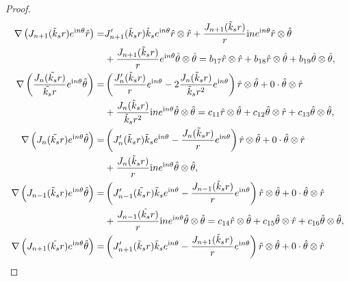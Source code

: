 \documentclass[11pt,reqno,twoside]{amsart}
\theoremstyle{definition}
\theoremstyle{remark}
\numberwithin{equation}{section}
\begin{document}
\begin{proof}
\begin{align}
		\nabla \left ( J_{n+1} (\tilde{k}_{s}  r)  e^{\mathrm{i}n\theta } \hat{r}\right )=& J_{n+1}' (\tilde{k}_{s} r) \tilde{k}_{s} e^{\mathrm{i}n\theta } \hat{r}\otimes\hat{r}+\frac{J_{n+1} ( \tilde{k}_{s}  r )}{r}\mathrm{i}n e^{\mathrm{i}n\theta }\hat{r}\otimes\hat{\theta }\notag\\
		&+\frac{J_{n+1} ( \tilde{k}_{s}  r )}{r}e^{\mathrm{i}n\theta }\hat{\theta }\otimes\hat{\theta }=b_{17}\hat{r}\otimes\hat{r}+b_{18}\hat{r}\otimes\hat{\theta }+b_{19}\hat{\theta }\otimes\hat{\theta },\notag\\
		\nabla \left ( \frac{J_{n} (\tilde{k_{s} } r )}{\tilde{k_{s}}r} e^{\mathrm{i}n\theta } \hat{\theta}  \right )=&\left( \frac{J_{n}' (\tilde{k}_{s}  r  )}{r} e^{\mathrm{i}n\theta } -2\frac{J_{n} (\tilde{k}_{s}  r  )}{\tilde{k}_{s}r^2} e^{\mathrm{i}n\theta }\right)\hat{r}\otimes\hat{\theta }+0\cdot \hat{\theta}\otimes\hat{r }\notag\\
		&+\frac{J_{n} (\tilde{k}_{s}  r )}{\tilde{k}_{s}r^2}\mathrm{i}ne^{\mathrm{i}n\theta }\hat{\theta }\otimes\hat{\theta }=c_{11}\hat{r}\otimes\hat{\theta }+c_{12}\hat{\theta}\otimes\hat{r }+c_{13}\hat{\theta }\otimes\hat{\theta },\notag\\
		\nabla \left ( J_{n} (\tilde{k_{s} } r ) e^{\mathrm{i}n\theta }\hat{\theta} \right )=&\left( J_{n}' (\tilde{k}_{s}  r ) \tilde{k}_{s} e^{\mathrm{i}n\theta } -\frac{J_{n} ( \tilde{k}_{s}  r )}{r} e^{\mathrm{i}n\theta }\right)\hat{r}\otimes\hat{\theta }+0\cdot \hat{\theta }\otimes\hat{r}\notag\\
		&+\frac{J_{n} ( \tilde{k}_{s}  r )}{r}\mathrm{i}ne^{\mathrm{i}n\theta }\hat{\theta }\otimes\hat{\theta },\notag\\
		\nabla \left ( J_{n-1} (\tilde{k}_{s}  r ) e^{\mathrm{i}n\theta } \hat{\theta} \right )=&\left( J_{n-1}' (\tilde{k_{s} }r) \tilde{k}_{s} e^{\mathrm{i}n\theta } -\frac{J_{n-1} ( \tilde{k}_{s}  r )}{r} e^{\mathrm{i}n\theta }\right)\hat{r}\otimes\hat{\theta }+0\cdot \hat{\theta }\otimes\hat{r}\notag\\
		&+\frac{J_{n-1} ( \tilde{k_{s} } r )}{r}\mathrm{i}ne^{\mathrm{i}n\theta }\hat{\theta }\otimes\hat{\theta }=c_{14}\hat{r}\otimes\hat{\theta }+c_{15}\hat{\theta}\otimes\hat{r }+c_{16}\hat{\theta }\otimes\hat{\theta },\notag\\
		\nabla \left ( J_{n+1} (\tilde{k_{s} } r ) e^{\mathrm{i}n\theta } \hat{\theta}  \right )=&\left( J_{n+1}' (\tilde{k}_{s} r) \tilde{k}_{s} e^{\mathrm{i}n\theta } -\frac{J_{n+1} ( \tilde{k}_{s}  r )}{r} e^{\mathrm{i}n\theta }\right)\hat{r}\otimes\hat{\theta }+0\cdot \hat{\theta }\otimes\hat{r}\notag\\

\end{align}
\end{proof}
\end{document}
